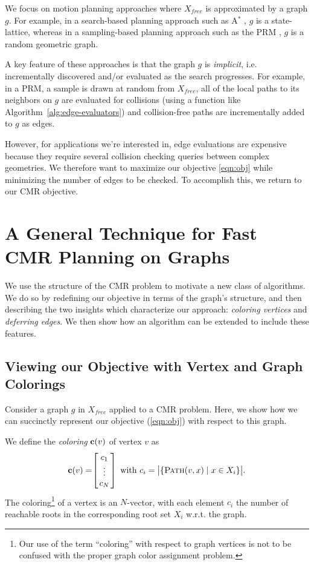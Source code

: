 \documentclass{report}
\begin{document}
We focus on motion planning approaches where
$X_{free}$ is approximated by a graph $g$.
For example,
in a search-based planning approach such as A$^*$ \cite{hart1968astar},
$g$ is a state-lattice,
whereas in a sampling-based planning approach such as the
PRM \cite{kavrakietal1996prm},
$g$ is a random geometric graph.

A key feature of these approaches is that the graph $g$ is \emph{implicit},
i.e. incrementally discovered and/or evaluated as the search progresses.
For example, in a PRM, a sample is drawn at random from $X_{free}$,
all of the local paths to its neighbors on $g$
are evaluated for collisions (using a function
like Algorithm~\ref{alg:edge-evaluators})
and collision-free paths are incrementally added to $g$ as edges.

However, for applications we're interested in,
edge evaluations are expensive \cite{lavalle2006planningbook}
because they require several collision checking queries between
complex geometries.
We therefore want to maximize our objective \eqref{eqn:obj}
while minimizing the number of edges to be checked.
To accomplish this, we return to our CMR objective.

\section{A General Technique for Fast CMR Planning on Graphs}
\label{sec:gen-sol}

We use the structure of the CMR problem
to motivate a new class of algorithms.
We do so by redefining our objective in terms of the graph's structure,
and then describing the two insights which characterize our approach:
\emph{coloring vertices} and \emph{deferring edges}.
We then show how an algorithm can be extended to include these features.

\subsection{Viewing our Objective with Vertex and Graph Colorings}

Consider a graph $g$ in $X_{free}$
applied to a CMR problem.
Here, we show how we can succinctly represent our objective
(\ref{eqn:obj}) with respect to this graph.

We define the \emph{coloring} ${\bf c}(v)$ of vertex $v$ as
\begin{equation}
   \arraycolsep=1.4pt
   {\bf c}(v) = \hspace{-0.03in} \left[\begin{array}{c}
   c_1 \\ \vdots \\ c_N \\
   \end{array}\right]
   \mbox{ with }
   c_i = \big| \{
      \textsc{Path}(v,x) \;|\; x \in X_i
      \} \big|.
\end{equation}
The coloring\footnote{
Our use of the term ``coloring'' with respect to graph vertices
is not to be confused with the proper graph color assignment problem.}
of a vertex is an $N$-vector,
with each element $c_i$ the number of reachable roots
in the corresponding root set $X_i$ w.r.t. the graph.
\end{document}
